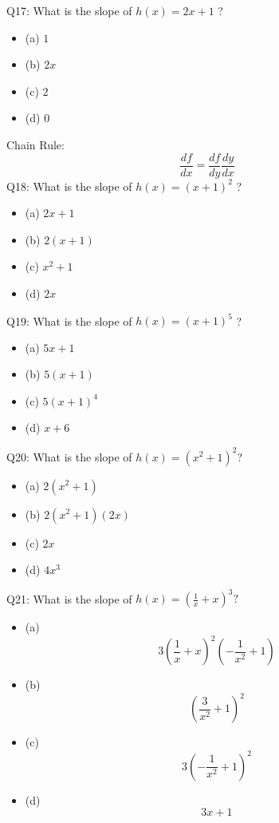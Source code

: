 \documentclass{article}
\begin{document}
Q17: What is the slope of $h(x)=2 x+1$ ?
\begin{itemize}
\item[] (a) $1$
\item[] (b) $2 x$
\item[] (c) $2$
\item[] (d) $0$
\end{itemize}
Chain Rule: 
$$\frac{d f}{d x}=\frac{d f}{d y} \frac{d y}{d x}$$
Q18: What is the slope of $h(x)=(x+1)^2$ ?
\begin{itemize}
\item[] (a) $2 x+1$
\item[] (b) $2(x+1)$
\item[] (c) $x^2+1$
\item[] (d) $2 x$
\end{itemize}
Q19: What is the slope of $h(x)=(x+1)^5$ ?
\begin{itemize}
\item[] (a) $5 x+1$
\item[] (b) $5(x+1)$
\item[] (c) $5(x+1)^4$
\item[] (d) $x+6$
\end{itemize}
Q20: What is the slope of $h(x)=\left(x^2+1\right)^2$?
\begin{itemize}
\item[] (a) $2\left(x^2+1\right)$
\item[] (b) $2\left(x^2+1\right)(2 x)$
\item[] (c) $2 x$
\item[] (d) $4 x^3$
\end{itemize}
Q21: What is the slope of $h(x)=\left(\frac{1}{x}+x\right)^3 ?$
\begin{itemize}
\item[] (a) $$3\left(\frac{1}{x}+x\right)^2\left(-\frac{1}{x^2}+1\right)$$
\item[] (b) $$\left(\frac{3}{x^2}+1\right)^2$$
\item[] (c) $$3\left(-\frac{1}{x^2}+1\right)^2$$
\item[] (d) $$3 x+1$$
\end{itemize}
\end{document}
